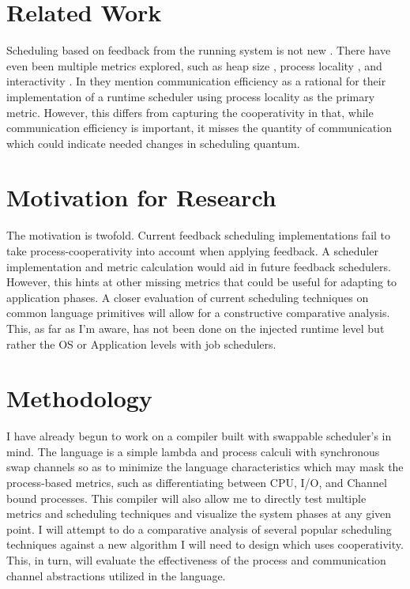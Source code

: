 \documentclass[11pt]{artikel3}
\begin{document}
\section{Related Work}

Scheduling based on feedback from the running system is not new \cite{dietz1997use}. There have even been multiple 
metrics explored, such as heap size \cite{white2012automated}, process locality \cite{debattista2002cache}, and interactivity \cite{reppy1993concurrent}. 
In \cite{ritson2012multicore} they mention communication efficiency as a rational for their implementation of a runtime scheduler using process locality 
as the primary metric. However, this differs from capturing the cooperativity in that, while communication efficiency is important, it misses the quantity 
of communication which could indicate needed changes in scheduling quantum.

\section{Motivation for Research}

The motivation is twofold. Current feedback scheduling implementations fail to take process-cooperativity 
into account when applying feedback. A scheduler implementation and metric calculation would aid in future 
feedback schedulers. However, this hints at other missing metrics that could be useful for adapting to
application phases. A closer evaluation of current scheduling techniques on common language primitives 
will allow for a constructive comparative analysis. This, as far as I'm aware, has not been done on the injected 
runtime level but rather the OS or Application levels with job schedulers. 


\section{Methodology}

I have already begun to work on a compiler built with swappable scheduler's in mind. The language 
is a simple lambda and process calculi with synchronous swap channels so as to minimize the language 
characteristics which may mask the process-based metrics, such as differentiating between CPU, I/O, 
and Channel bound processes. This compiler will also allow me to directly test multiple metrics and 
scheduling techniques and visualize the system phases at any given point. I will attempt to do a 
comparative analysis of several popular scheduling techniques against a new algorithm I will need to design 
which uses cooperativity. This, in turn, will evaluate the effectiveness of the process and communication 
channel abstractions utilized in the language.
\end{document}

